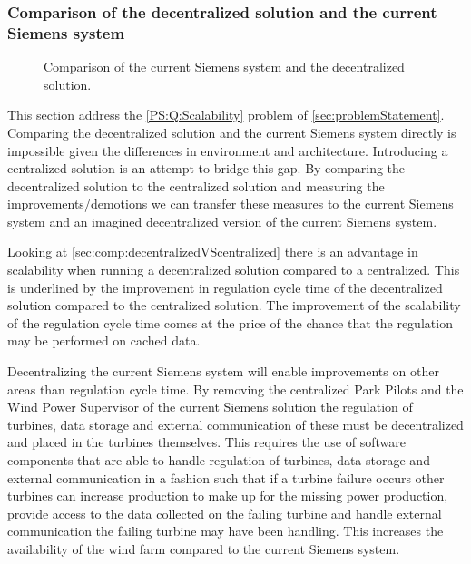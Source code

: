 \subsubsection{Comparison of the decentralized solution and the current Siemens system}

\begin{figure}[!h]
	\centering
	
	\caption[Comparison of the current centralized solution and the decentralized solution]{
		\label{fig:projectDiffOverviewSiemensDecentralized}
		\footnotesize{%
			Comparison of the current Siemens system and the decentralized solution.
		}
	}
\end{figure}

This section address the \ref{PS:Q:Scalability} problem of \cref{sec:problemStatement}.
Comparing the decentralized solution and the current Siemens system directly is impossible given the differences in environment and architecture. Introducing a centralized solution is an attempt to bridge this gap. By comparing the decentralized solution to the centralized solution and measuring the improvements/demotions we can transfer these measures to the current Siemens system and an imagined decentralized version of the current Siemens system.

Looking at \cref{sec:comp:decentralizedVScentralized} there is an advantage in scalability when running a decentralized solution compared to a centralized. This is underlined by the improvement in regulation cycle time of the decentralized solution compared to the centralized solution. The improvement of the scalability of the regulation cycle time comes at the price of the chance that the regulation may be performed on cached data.

Decentralizing the current Siemens system will enable improvements on other areas than regulation cycle time. By removing the centralized Park Pilots and the Wind Power Supervisor of the current Siemens solution the regulation of turbines, data storage and external communication of these must be decentralized and placed in the turbines themselves. This requires the use of software components that are able to handle regulation of turbines, data storage and external communication in a fashion such that if a turbine failure occurs other turbines can increase production to make up for the missing power production, provide access to the data collected on the failing turbine and handle external communication the failing turbine may have been handling. This increases the availability of the wind farm compared to the current Siemens system.


